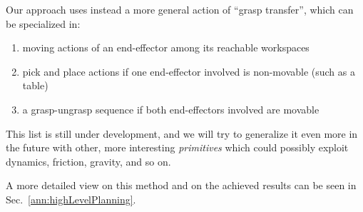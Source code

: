 Our approach uses instead a more general action of ``grasp transfer'', which can be specialized in:
\begin{enumerate}
	\item moving actions of an end-effector among its reachable workspaces
	\item pick and place actions if one end-effector involved is non-movable (such as a table)
	\item a grasp-ungrasp sequence if both end-effectors involved are movable
\end{enumerate}
This list is still under development, and we will try to generalize it even more in the future with other, more interesting \emph{primitives} which could possibly exploit dynamics, friction, gravity, and so on.

A more detailed view on this method and on the achieved results can be seen in Sec.~\ref{ann:highLevelPlanning}. %
